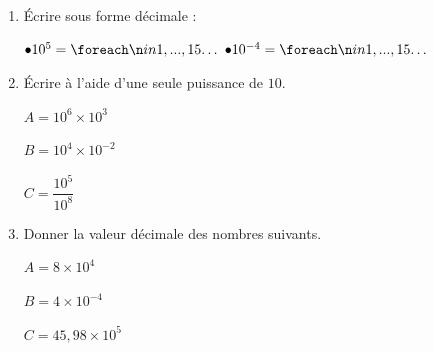 \documentclass[a4paper]{book}
\begin{document}
    
    \begin{exemple}
        \begin{enumerate}[leftmargin=*]
            \item Écrire sous forme décimale :
            
            \begin{center}
                $\bullet 10^5 = \points[15]$\hspace{4cm}
                $\bullet 10^{-4} = \points[15]$
            \end{center}

            \item Écrire à l'aide d'une seule puissance de $10$.

            \begin{minipage}{0.30\linewidth}
                $A=10^6 \times 10^3$

                \vspace{2cm}
            \end{minipage}
            \hfill \vline \hfill
            \begin{minipage}{0.30\linewidth}
                $B=10^4 \times 10^{-2}$

                \vspace{2cm}
            \end{minipage}
            \hfill \vline \hfill
            \begin{minipage}{0.30\linewidth}
                $C=\dfrac{10^5}{10^8}$

                \vspace{2cm}
            \end{minipage}

            \item Donner la valeur décimale des nombres suivants.
            
            \begin{minipage}{0.30\linewidth}
                $A = 8\times10^4$
    
                \vspace{2cm}
            \end{minipage}
            \hfill \vline \hfill
            \begin{minipage}{0.30\linewidth}
                $B = 4\times10^{-4}$
    
                \vspace{2cm}
            \end{minipage}     
            \hfill \vline \hfill
            \begin{minipage}{0.30\linewidth}
                 $C = 45,98\times10^5$ 
    
                 \vspace{2cm}
            \end{minipage}     
        \end{enumerate}          
    \end{exemple}
\end{document}
